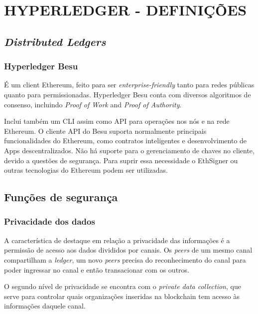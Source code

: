 \chapter{\textbf{HYPERLEDGER - DEFINIÇÕES}}

\section{\textit{Distributed Ledgers}} 
    \subsection{Hyperledger Besu} %
    
        É um client Ethereum, feito para ser \textit{enterprise-friendly} tanto para redes públicas quanto para permissionadas. Hyperledger Besu conta com diversos algoritmos de consenso, incluindo \textit{Proof of Work} and \textit{Proof of Authority}.
    
        Inclui também um CLI assim como API para operações nos nós e na rede Ethereum. O cliente API do Besu suporta normalmente principais funcionalidades do Ethereum, como contratos inteligentes e desenvolvimento de Apps descentralizados. Não há suporte para o gerenciamento de chaves no cliente, devido a questões de segurança. Para suprir essa necessidade o EthSigner ou outras tecnologias do Ethereum podem ser utilizadas.
    
\section{Funções de segurança}
    \subsection{Privacidade dos dados}%
        A característica de destaque em relação a privacidade das informações é a permissão de acesso aos dados divididos por canais. Os \textit{peers} de um mesmo canal compartilham a \textit{ledger}, um novo \textit{peers} precisa do reconhecimento do canal para poder ingressar no canal e então transacionar com os outros. 
    
        O segundo nível de privacidade se encontra com o \textit{private data collection}, que serve para controlar quais organizações inseridas na blockchain tem acesso às informações daquele canal.
  
